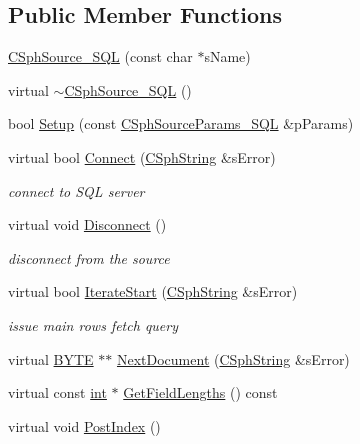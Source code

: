 \subsection*{Public Member Functions}
\begin{DoxyCompactItemize}
\item 
\hyperlink{structCSphSource__SQL_a8fabd91a3a49a0eff01eebc9f2f3a529}{C\-Sph\-Source\-\_\-\-S\-Q\-L} (const char $\ast$s\-Name)
\item 
virtual \hyperlink{structCSphSource__SQL_a440f2c37067d7ee37c1c4ce5b6098777}{$\sim$\-C\-Sph\-Source\-\_\-\-S\-Q\-L} ()
\item 
bool \hyperlink{structCSphSource__SQL_a6ef468427ca6b7d3d66f2079fb06ac16}{Setup} (const \hyperlink{structCSphSourceParams__SQL}{C\-Sph\-Source\-Params\-\_\-\-S\-Q\-L} \&p\-Params)
\item 
virtual bool \hyperlink{structCSphSource__SQL_a2c19c1d1ddab42d9eed3d6d3b3bf4c0a}{Connect} (\hyperlink{structCSphString}{C\-Sph\-String} \&s\-Error)
\begin{DoxyCompactList}\small\item\em connect to S\-Q\-L server \end{DoxyCompactList}\item 
virtual void \hyperlink{structCSphSource__SQL_a652ad7d017010cbeb85731060213a39c}{Disconnect} ()
\begin{DoxyCompactList}\small\item\em disconnect from the source \end{DoxyCompactList}\item 
virtual bool \hyperlink{structCSphSource__SQL_a5806ed4a14570cb3383431d165cceb66}{Iterate\-Start} (\hyperlink{structCSphString}{C\-Sph\-String} \&s\-Error)
\begin{DoxyCompactList}\small\item\em issue main rows fetch query \end{DoxyCompactList}\item 
virtual \hyperlink{sphinxstd_8h_a4ae1dab0fb4b072a66584546209e7d58}{B\-Y\-T\-E} $\ast$$\ast$ \hyperlink{structCSphSource__SQL_a6ab08757e849aefa6260c583d1d9101c}{Next\-Document} (\hyperlink{structCSphString}{C\-Sph\-String} \&s\-Error)
\item 
virtual const \hyperlink{sphinxexpr_8cpp_a4a26e8f9cb8b736e0c4cbf4d16de985e}{int} $\ast$ \hyperlink{structCSphSource__SQL_ad9a8d2d28e870a3ba25ef4ef7988c4d6}{Get\-Field\-Lengths} () const 
\item 
virtual void \hyperlink{structCSphSource__SQL_a458e30ee09ccca767273609741a7311b}{Post\-Index} ()
$$
\end{DoxyCompactItemize}

